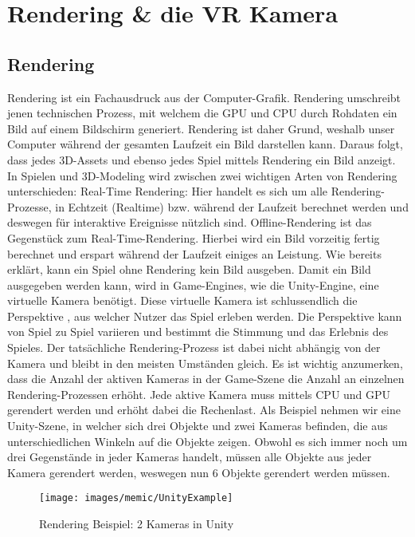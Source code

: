\section{Rendering \& die VR Kamera}


\subsection{Rendering}

Rendering ist ein Fachausdruck aus der Computer-Grafik. Rendering umschreibt jenen technischen Prozess, mit welchem die GPU  und CPU durch Rohdaten ein Bild auf einem Bildschirm generiert. Rendering ist daher Grund, weshalb unser Computer während der gesamten Laufzeit ein Bild darstellen kann. Daraus folgt, dass jedes 3D-Assets und ebenso jedes Spiel mittels Rendering ein Bild anzeigt. In Spielen und 3D-Modeling wird zwischen zwei wichtigen Arten von Rendering unterschieden:
Real-Time Rendering: Hier handelt es sich um alle Rendering-Prozesse, in Echtzeit (Realtime) bzw. während der Laufzeit berechnet werden und deswegen für interaktive Ereignisse nützlich sind.\cite{_guide_to_Build_3D_Character}
Offline-Rendering ist das Gegenstück zum Real-Time-Rendering. Hierbei wird ein Bild vorzeitig fertig berechnet und erspart während der Laufzeit einiges an Leistung.\cite{_guide_to_Build_3D_Character}
Wie bereits erklärt, kann ein Spiel ohne Rendering kein Bild ausgeben. Damit ein Bild ausgegeben werden kann, wird in Game-Engines, wie die Unity-Engine, eine virtuelle Kamera benötigt. Diese virtuelle Kamera ist schlussendlich die Perspektive , aus welcher Nutzer das Spiel erleben werden. Die Perspektive kann von Spiel zu Spiel variieren und bestimmt die Stimmung und das Erlebnis des Spieles. Der tatsächliche Rendering-Prozess ist dabei nicht abhängig von der Kamera und bleibt in den meisten Umständen gleich.
Es ist wichtig anzumerken, dass die Anzahl der aktiven Kameras in der Game-Szene die Anzahl an einzelnen Rendering-Prozessen erhöht. Jede aktive Kamera muss mittels CPU und GPU gerendert werden und erhöht dabei die Rechenlast.
Als Beispiel nehmen wir eine Unity-Szene, in welcher sich drei Objekte und zwei Kameras befinden, die aus unterschiedlichen Winkeln auf die Objekte zeigen. Obwohl es sich immer noch um drei Gegenstände in jeder Kameras handelt, müssen alle Objekte aus jeder Kamera gerendert werden, weswegen nun 6 Objekte gerendert werden müssen.

\begin{figure}[H]
	\centering
	\texttt{[image: images/memic/UnityExample]}
	\caption{Rendering Beispiel: 2 Kameras in Unity}
\end{figure}

